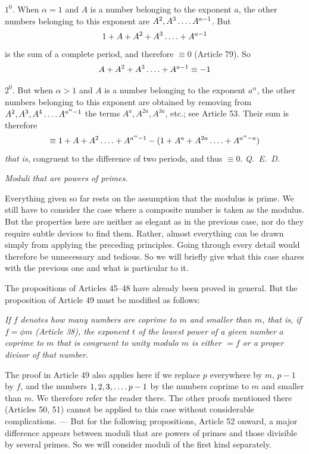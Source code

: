 $1^0$. When $\alpha=1$ and $A$ is a number belonging to the exponent $a$, the other numbers belonging to this exponent are $A^2,A^3\mathinner{\ldotp\ldotp\ldotp\ldotp} A^{a-1}$. But
\[1+A+A^2+A^3\mathinner{\ldotp\ldotp\ldotp\ldotp}+A^{a-1}\]
is the sum of a complete period, and therefore $\equiv0$ (Article 79). So
\[A+A^2+A^3\mathinner{\ldotp\ldotp\ldotp\ldotp}+A^{a-1}\equiv-1\]

$2^0$. But when $\alpha>1$ and $A$ is a number belonging to the exponent $a^{\alpha}$, the other numbers belonging to this exponent are obtained by removing from $A^2,A^3,A^4\mathinner{\ldotp\ldotp\ldotp\ldotp} A^{a^{\alpha}-1}$ the terms $A^a,A^{2a},A^{3a}$, etc.; see Article 53. Their sum is therefore
\[\equiv1+A+A^2\mathinner{\ldotp\ldotp\ldotp\ldotp}+A^{a^{\alpha}-1}-(1+A^a+A^{2a}\mathinner{\ldotp\ldotp\ldotp\ldotp}+A^{a^{\alpha}-a})\]
\emph{that is,} congruent to the difference of two periods, and thus $\equiv0$. \mbox{\emph{Q. E. D.}}

\begin{center}\emph{Moduli that are powers of primes.}\end{center}

Everything given so far rests on the assumption that the modulus is prime. We still have to consider the case where a composite number is taken as the modulus. But the properties here are neither as elegant as in the previous case, nor do they require subtle devices to find them. Rather, almost everything can be drawn simply from applying the preceding principles. Going through every detail would therefore be unnecessary and tedious. So we will briefly give what this case shares with the previous one and what is particular to it.

The propositions of Articles 45–48 have already been proved in general. But the proposition of Article 49 must be modified as follows:

\emph{If $f$ denotes how many numbers are coprime to $m$ and smaller than $m$, that is, if $f=\phi m$ (Article 38), the exponent $t$ of the lowest power of a given number $a$ coprime to $m$ that is congruent to unity modulo $m$ is either $=f$ or a proper divisor of that number.}

The proof in Article 49 also applies here if we replace $p$ everywhere by $m$, $p-1$ by $f$, and the numbers $1,2,3,\mathinner{\ldotp\ldotp\ldotp\ldotp} p-1$ by the numbers coprime to $m$ and smaller than $m$. We therefore refer the reader there. The other proofs mentioned there (Articles 50, 51) cannot be applied to this case without considerable complications. --- But for the following propositions, Article 52 onward, a major difference appears between moduli that are powers of primes and those divisible by several primes. So we will consider moduli of the first kind separately.

